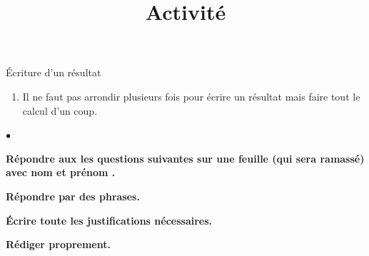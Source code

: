 \documentclass[24pt]{article}
\begin{document}
\begin{concept}{Écriture d'un résultat}
\begin{enumerate}


        \item Il ne faut pas arrondir plusieurs fois pour écrire un résultat mais faire tout le calcul d'un coup.

    \end{enumerate}
\end{concept}










\title{Activité}
\maketitle


\begin{center}
    \large \begin{list}{$\bullet$}{}
        \item \textbf{Répondre aux les questions suivantes sur une feuille (qui sera ramassé) avec nom et prénom . }
        \item \textbf{Répondre par des phrases.}
        \item \textbf{Écrire toute les justifications nécessaires.}
        \item \textbf{Rédiger proprement.}
    \end{list}
\end{center}


\end{document}
